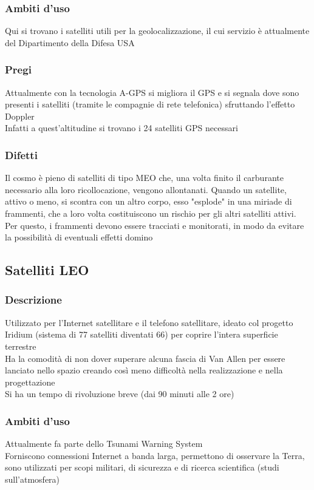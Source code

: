 \documentclass[10pt,oneside,a4paper]{article}
\begin{document}
\subsubsection{Ambiti d'uso}
Qui si trovano i satelliti utili per la geolocalizzazione, il cui servizio è attualmente del Dipartimento della Difesa USA
\subsubsection{Pregi}
Attualmente con la tecnologia A-GPS si migliora il GPS e si segnala dove sono presenti i satelliti (tramite le compagnie di rete telefonica) sfruttando l'effetto Doppler\\
Infatti a quest'altitudine si trovano i 24 satelliti GPS necessari
\subsubsection{Difetti}
Il cosmo è pieno di satelliti di tipo MEO che, una volta finito il carburante necessario alla loro ricollocazione, vengono allontanati. Quando un satellite, attivo o meno, si scontra con un altro corpo, esso "esplode" in una miriade di frammenti, che a loro volta costituiscono un rischio per gli altri satelliti attivi. Per questo, i frammenti devono essere tracciati e monitorati, in modo da evitare la possibilità di eventuali effetti domino
\subsection{Satelliti LEO}
\subsubsection{Descrizione}
Utilizzato per l'Internet satellitare e il telefono satellitare, ideato col progetto Iridium (sistema di 77 satelliti diventati 66) per coprire l'intera superficie terrestre\\
Ha la comodità di non dover superare alcuna fascia di Van Allen per essere lanciato nello spazio creando così meno difficoltà nella realizzazione e nella progettazione\\
Si ha un tempo di rivoluzione breve (dai 90 minuti alle 2 ore)
\subsubsection{Ambiti d'uso}
Attualmente fa parte dello Tsunami Warning System\\
Forniscono connessioni Internet a banda larga, permettono di osservare la Terra, sono utilizzati per scopi militari, di sicurezza e di ricerca scientifica (studi sull'atmosfera)
\end{document}
